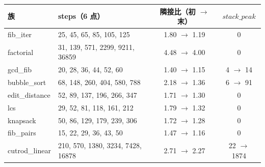 \begin{tabular}{l l c c}
\toprule
族 & steps（6 点） & 隣接比（初 $\to$ 末） & $\mathit{stack\_peak}$ \\
\midrule
fib\_iter & 25, 45, 65, 85, 105, 125 & 1.80 $\to$ 1.19 & 0 \\
factorial & 31, 139, 571, 2299, 9211, 36859 & 4.48 $\to$ 4.00 & 0 \\
gcd\_fib & 20, 28, 36, 44, 52, 60 & 1.40 $\to$ 1.15 & 4 $\to$ 14 \\
bubble\_sort & 68, 148, 260, 404, 580, 788 & 2.18 $\to$ 1.36 & 6 $\to$ 91 \\
edit\_distance & 52, 89, 137, 196, 266, 347 & 1.71 $\to$ 1.30 & 0 \\
lcs & 29, 52, 81, 118, 161, 212 & 1.79 $\to$ 1.32 & 0 \\
knapsack & 50, 86, 129, 179, 239, 306 & 1.72 $\to$ 1.28 & 0 \\
fib\_pairs & 15, 22, 29, 36, 43, 50 & 1.47 $\to$ 1.16 & 0 \\
cutrod\_linear & 210, 570, 1380, 3234, 7428, 16878 & 2.71 $\to$ 2.27 & 22 $\to$ 1874 \\
\bottomrule
\end{tabular}
